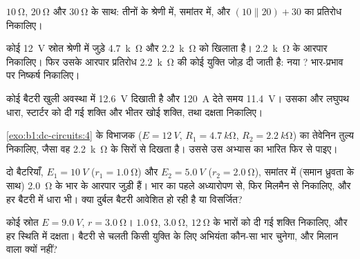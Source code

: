 \begin{exercise}[$\star$]\label{exo:b1:dc-circuits:3}
$\qty{10}{\ohm}$, $\qty{20}{\ohm}$ और $\qty{30}{\ohm}$ के साथ: तीनों के
श्रेणी में, समांतर में, और
$(10 \parallel 20) + 30$ का प्रतिरोध निकालिए।
\end{exercise}

\begin{exercise}[$\star$]\label{exo:b1:dc-circuits:4}
कोई \qty{12}{V} स्रोत श्रेणी में जुड़े \qty{4.7}{k\ohm} और \qty{2.2}{k\ohm}
को खिलाता है। \qty{2.2}{k\ohm} के आरपार  निकालिए। फिर उसके आरपार
प्रतिरोध \qty{2.2}{k\ohm} की कोई युक्ति जोड़ दी जाती है: नया ?
भार-प्रभाव पर निष्कर्ष निकालिए।
\end{exercise}

\begin{exercise}[$\star\star$]\label{exo:b1:dc-circuits:5}
कोई बैटरी खुली अवस्था में \qty{12.6}{V} दिखाती है और \qty{120}{A} देते समय
\qty{11.4}{V}। उसका  और लघुपथ धारा, स्टार्टर को दी गई शक्ति
और भीतर खोई शक्ति, तथा दक्षता निकालिए।
\end{exercise}

\begin{exercise}[$\star\star$]\label{exo:b1:dc-circuits:6}
\cref{exo:b1:dc-circuits:4} के विभाजक
($E = \qty{12}{V}$, $R_1 = \qty{4.7}{k\ohm}$, $R_2 = \qty{2.2}{k\ohm}$) का
तेवेनिन तुल्य निकालिए, जैसा वह \qty{2.2}{k\ohm}  के सिरों से दिखता
है। उससे उस अभ्यास का भारित  फिर से पाइए।
\end{exercise}

\begin{exercise}[$\star\star$]\label{exo:b1:dc-circuits:7}
दो बैटरियाँ, $E_1 = \qty{10}{V}$ ($r_1 = \qty{1.0}{\ohm}$) और
$E_2 = \qty{5.0}{V}$ ($r_2 = \qty{2.0}{\ohm}$), समांतर में (समान ध्रुवता के
साथ) \qty{2.0}{\ohm} के भार के आरपार जुड़ी हैं। भार का  पहले
अध्यारोपण से, फिर मिलमैन से निकालिए, और हर बैटरी में धारा भी। क्या दुर्बल
बैटरी आवेशित हो रही है या विसर्जित?
\end{exercise}

\begin{exercise}[$\star\star$]\label{exo:b1:dc-circuits:8}
कोई स्रोत $E = \qty{9.0}{V}$, $r = \qty{3.0}{\ohm}$। $\qty{1.0}{\ohm}$,
$\qty{3.0}{\ohm}$, $\qty{12}{\ohm}$ के भारों को दी गई शक्ति निकालिए,
और हर स्थिति में दक्षता। बैटरी से चलती किसी युक्ति के लिए अभियंता कौन-सा भार
चुनेगा, और मिलान वाला क्यों नहीं?
\end{exercise}

